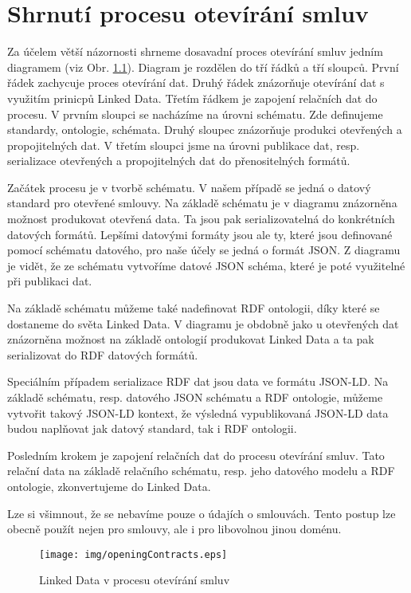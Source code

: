 \chapter{Shrnutí procesu otevírání smluv}

Za účelem větší názornosti shrneme dosavadní proces otevírání smluv jedním diagramem (viz Obr. \ref{obr:openingContracts}). Diagram je rozdělen do tří řádků a tří sloupců. První řádek zachycuje proces otevírání dat. Druhý řádek znázorňuje otevírání dat s využitím prinicpů Linked Data. Třetím řádkem je zapojení relačních dat do procesu. V prvním sloupci se nacházíme na úrovni schématu. Zde definujeme standardy, ontologie, schémata. Druhý sloupec znázorňuje produkci otevřených a propojitelných dat. V třetím sloupci jsme na úrovni publikace dat, resp. serializace otevřených a propojitelných dat do přenositelných formátů.

Začátek procesu je v tvorbě schématu. V našem případě se jedná o datový standard pro otevřené smlouvy. Na základě schématu je v diagramu znázorněna možnost produkovat otevřená data. Ta jsou pak serializovatelná do konkrétních datových formátů. Lepšími datovými formáty jsou ale ty, které jsou definované pomocí schématu datového, pro naše účely se jedná o formát JSON. Z diagramu je vidět, že ze schématu vytvoříme datové JSON schéma, které je poté využitelné při publikaci dat.

Na základě schématu můžeme také nadefinovat RDF ontologii, díky které se dostaneme do světa Linked Data. V diagramu je obdobně jako u otevřených dat znázorněna možnost na základě ontologií produkovat Linked Data a ta pak serializovat do RDF datových formátů.

Speciálním případem serializace RDF dat jsou data ve formátu JSON-LD. Na základě schématu, resp. datového JSON schématu a RDF ontologie, můžeme vytvořit takový JSON-LD kontext, že výsledná vypublikovaná JSON-LD data budou naplňovat jak datový standard, tak i RDF ontologii.

Posledním krokem je zapojení relačních dat do procesu otevírání smluv. Tato relační data na základě relačního schématu, resp. jeho datového modelu a RDF ontologie, zkonvertujeme do Linked Data.

Lze si všimnout, že se nebavíme pouze o údajích o smlouvách. Tento postup lze obecně použít nejen pro smlouvy, ale i pro libovolnou jinou doménu.

\begin{figure}[H]
\centerline{\texttt{[image: img/openingContracts.eps]}}
\caption{Linked Data v procesu otevírání smluv}
\label{obr:openingContracts}
\end{figure}